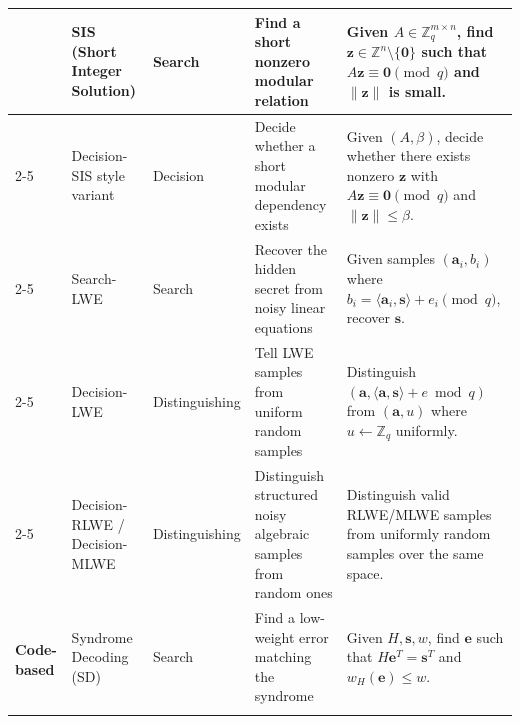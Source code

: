 \documentclass[11pt]{article}
\begin{document}
\begin{center}
\begin{tabular}{|p{2.1cm}|p{3.2cm}|p{1.8cm}|p{3.8cm}|p{5.0cm}|}
			& SIS (Short Integer Solution)
			& Search
			& Find a short nonzero modular relation
			& Given $A \in \mathbb{Z}_q^{m\times n}$, find $\bm z \in \mathbb{Z}^n\setminus\{\bm 0\}$ such that $A\bm z \equiv \bm 0 \pmod q$ and $\|\bm z\|$ is small. \\
			\cline{2-5}
			
			& Decision-SIS style variant
			& Decision
			& Decide whether a short modular dependency exists
			& Given $(A,\beta)$, decide whether there exists nonzero $\bm z$ with $A\bm z \equiv \bm 0 \pmod q$ and $\|\bm z\|\le \beta$. \\
			\cline{2-5}
			
			& Search-LWE
			& Search
			& Recover the hidden secret from noisy linear equations
			& Given samples $(\bm a_i,b_i)$ where $b_i=\langle \bm a_i,\bm s\rangle+e_i \pmod q$, recover $\bm s$. \\
			\cline{2-5}
			
			& Decision-LWE
			& Distinguishing
			& Tell LWE samples from uniform random samples
			& Distinguish $(\bm a,\langle \bm a,\bm s\rangle+e \bmod q)$ from $(\bm a,u)$ where $u \leftarrow \mathbb{Z}_q$ uniformly. \\
			\cline{2-5}
			
			& Decision-RLWE / Decision-MLWE
			& Distinguishing
			& Distinguish structured noisy algebraic samples from random ones
			& Distinguish valid RLWE/MLWE samples from uniformly random samples over the same space. \\
			\hline
			
			\multirow{6}{=}{\textbf{Code-based}}
			& Syndrome Decoding (SD)
			& Search
			& Find a low-weight error matching the syndrome
			& Given $H,\bm s,w$, find $\bm e$ such that $H\bm e^T=\bm s^T$ and $w_H(\bm e)\le w$. \\
			\cline{2-5}
			

\end{tabular}
\end{center}
\end{document}
